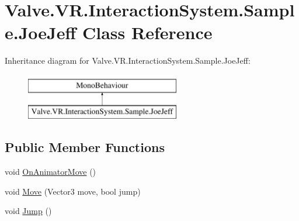 \hypertarget{class_valve_1_1_v_r_1_1_interaction_system_1_1_sample_1_1_joe_jeff}{}\section{Valve.\+V\+R.\+Interaction\+System.\+Sample.\+Joe\+Jeff Class Reference}
\label{class_valve_1_1_v_r_1_1_interaction_system_1_1_sample_1_1_joe_jeff}
Inheritance diagram for Valve.\+V\+R.\+Interaction\+System.\+Sample.\+Joe\+Jeff\+:\begin{figure}[H]
\begin{center}
\leavevmode
\includegraphics[height=2.000000cm]{class_valve_1_1_v_r_1_1_interaction_system_1_1_sample_1_1_joe_jeff}
\end{center}
\end{figure}
\subsection*{Public Member Functions}
\begin{DoxyCompactItemize}
\item 
void \mbox{\hyperlink{class_valve_1_1_v_r_1_1_interaction_system_1_1_sample_1_1_joe_jeff_ad0406f46ad7cfffa15d9e1e95cc37ed6}{On\+Animator\+Move}} ()
\item 
void \mbox{\hyperlink{class_valve_1_1_v_r_1_1_interaction_system_1_1_sample_1_1_joe_jeff_aa4082021140313e24d77e4070f8fd3ad}{Move}} (Vector3 move, bool jump)
\item 
void \mbox{\hyperlink{class_valve_1_1_v_r_1_1_interaction_system_1_1_sample_1_1_joe_jeff_a1b6528311050c8005057adbf4a0d7cb7}{Jump}} ()
\end{DoxyCompactItemize}
